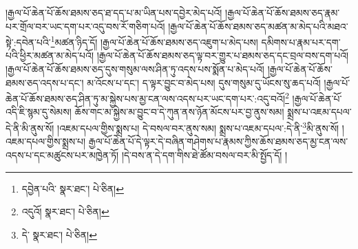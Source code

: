 །རྒྱལ་པོ་ཆེན་པོ་ཆོས་ཐམས་ཅད་ཐ་དད་པ་མ་ཡིན་པས་དབྱེར་མེད་པའོ། །རྒྱལ་པོ་ཆེན་པོ་ཆོས་ཐམས་ཅད་རྣམ་པར་གྲོལ་བར་ཡང་དག་པར་འདུ་བས་རོ་གཅིག་པའོ། །རྒྱལ་པོ་ཆེན་པོ་ཆོས་ཐམས་ཅད་མཚན་མ་མེད་པའི་མཐའ་སྟེ་:དབེན་པའི་\footnote{དབྱེན་པའི་  སྣར་ཐང་།  པེ་ཅིན། }མཚན་ཉིད་དོ། །རྒྱལ་པོ་ཆེན་པོ་ཆོས་ཐམས་ཅད་འཇུག་པ་མེད་པས། དམིགས་པ་རྣམ་པར་དག་པའི་ཕྱིར་མཚན་མ་མེད་པའོ། །རྒྱལ་པོ་ཆེན་པོ་ཆོས་ཐམས་ཅད་ལྟ་བར་གྱུར་པ་ཐམས་ཅད་དང་བྲལ་བས་དག་པའོ། །རྒྱལ་པོ་ཆེན་པོ་ཆོས་ཐམས་ཅད་དུས་གསུམ་ལས་ཤིན་ཏུ་འདས་པས་སྨོན་པ་མེད་པའོ། །རྒྱལ་པོ་ཆེན་པོ་ཆོས་ཐམས་ཅད་འདས་པ་དང་། མ་འོངས་པ་དང་། ད་ལྟར་བྱུང་བ་མེད་པས། དུས་གསུམ་དུ་ཡོངས་སུ་ཆད་པའོ། །རྒྱལ་པོ་ཆེན་པོ་ཆོས་ཐམས་ཅད་ཤིན་ཏུ་མ་སྐྱེས་པས་མྱ་ངན་ལས་འདས་པར་ཡང་དག་པར་:འདུ་བའོ།\footnote{འདུའོ།  སྣར་ཐང་།  པེ་ཅིན། } །རྒྱལ་པོ་ཆེན་པོ་འདི་ཇི་སྙམ་དུ་སེམས། ཆོས་གང་མ་སྐྱེས་མ་བྱུང་བ་དེ་ཀུན་ནས་ཉོན་མོངས་པར་བྱ་ནུས་སམ། སྨྲས་པ་འཇམ་དཔལ་དེ་ནི་མི་ནུས་སོ། །འཇམ་དཔལ་གྱིས་སྨྲས་པ། དེ་བསལ་བར་ནུས་སམ། སྨྲས་པ་འཇམ་དཔལ་:དེ་ནི་\footnote{དེ་  སྣར་ཐང་།  པེ་ཅིན། }མི་ནུས་སོ། །འཇམ་དཔལ་གྱིས་སྨྲས་པ། རྒྱལ་པོ་ཆེན་པོ་དེ་ལྟར་དེ་བཞིན་གཤེགས་པ་རྣམས་ཀྱིས་ཆོས་ཐམས་ཅད་མྱ་ངན་ལས་འདས་པ་དང་མཚུངས་པར་མཁྱེན་ཏོ། །དེ་བས་ན་དེ་དག་གིས་ཐེ་ཚོམ་བསལ་བར་མི་སྤྱོད་དོ། །
